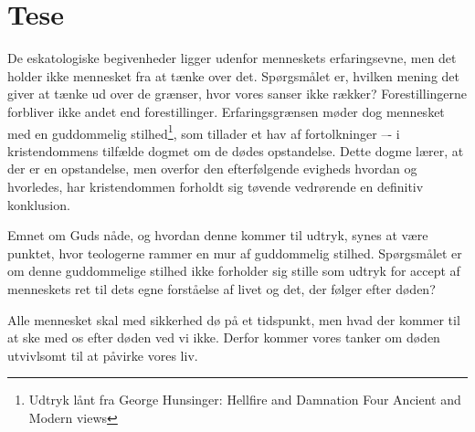 \chapter{Tese}
De eskatologiske begivenheder ligger udenfor menneskets erfaringsevne, men det holder ikke mennesket fra at tænke over det. Spørgsmålet er, hvilken mening det giver at tænke ud over de grænser, hvor vores sanser ikke rækker? Forestillingerne forbliver ikke andet end forestillinger. Erfaringsgrænsen møder dog mennesket med en guddommelig stilhed\footnote{Udtryk lånt fra George Hunsinger: Hellfire and Damnation Four Ancient and Modern views}, som tillader et hav af fortolkninger –- i kristendommens tilfælde dogmet om de dødes opstandelse. Dette dogme lærer, at der er en opstandelse, men overfor den efterfølgende evigheds hvordan og hvorledes, har kristendommen forholdt sig tøvende vedrørende en definitiv konklusion. 

Emnet om Guds nåde, og hvordan denne kommer til udtryk, synes at være punktet, hvor teologerne rammer en mur af guddommelig stilhed. Spørgsmålet er om denne guddommelige stilhed ikke forholder sig stille som udtryk for accept af menneskets ret til dets egne forståelse af livet og det, der følger efter døden?

Alle mennesket skal med sikkerhed dø på et tidspunkt, men hvad der kommer til at ske med os efter døden ved vi ikke. Derfor kommer vores tanker om døden utvivlsomt til at påvirke vores liv.